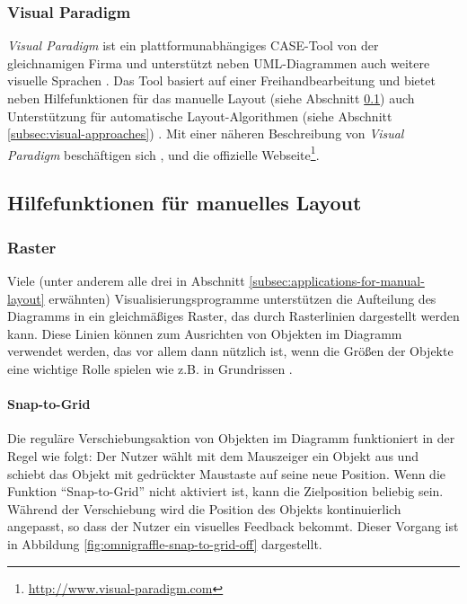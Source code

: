 \subsubsection{Visual Paradigm}
\label{subsubsec:visual-paradigm}

\textit{Visual Paradigm} ist ein plattformunabhängiges CASE-Tool von der gleichnamigen Firma und unterstützt neben UML-Diagrammen auch weitere visuelle Sprachen \cite{14Visual}. Das Tool basiert auf einer Freihandbearbeitung und bietet neben Hilfefunktionen für das manuelle Layout (siehe Abschnitt \ref{subsec:help-functions-for-manual-layout}) auch Unterstützung für automatische Layout-Algorithmen (siehe Abschnitt \ref{subsec:visual-approaches}) \cite{Fuhrmann11On-the-Pragmatics}. Mit einer näheren Beschreibung von \textit{Visual Paradigm} beschäftigen sich \cite{14Visual}, \cite[S.313-314]{Fuhrmann11On-the-Pragmatics} und die offizielle Webseite\footnote{\url{http://www.visual-paradigm.com}}.

\subsection{Hilfefunktionen für manuelles Layout}
\label{subsec:help-functions-for-manual-layout}

\subsubsection{Raster}
\label{subsubsec:grid}

Viele (unter anderem alle drei in Abschnitt \ref{subsec:applications-for-manual-layout} erwähnten) Visualisierungsprogramme unterstützen die Aufteilung des Diagramms in ein gleichmäßiges Raster, das durch Rasterlinien dargestellt werden kann. Diese Linien können zum Ausrichten von Objekten im Diagramm verwendet werden, das vor allem dann nützlich ist, wenn die Größen der Objekte eine wichtige Rolle spielen wie z.B. in Grundrissen \cite{08OmniGraffle, Olsen10OmniGraffle, 11Keynote, 14Visual}.

\paragraph{Snap-to-Grid}

Die reguläre Verschiebungsaktion von Objekten im Diagramm funktioniert in der Regel wie folgt: Der Nutzer wählt mit dem Mauszeiger ein Objekt aus und schiebt das Objekt mit gedrückter Maustaste auf seine neue Position. Wenn die Funktion \enquote{Snap-to-Grid} nicht aktiviert ist, kann die Zielposition beliebig sein. Während der Verschiebung wird die Position des Objekts kontinuierlich angepasst, so dass der Nutzer ein visuelles Feedback bekommt. Dieser Vorgang ist in Abbildung \ref{fig:omnigraffle-snap-to-grid-off} dargestellt.

